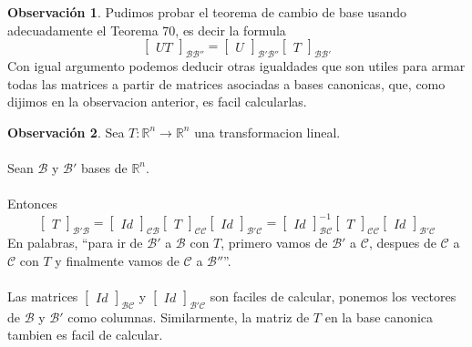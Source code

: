 \documentclass{article}
\theoremstyle{definition}
\theoremstyle{definition}
\newtheorem*{obs}{Observación}
\theoremstyle{remark}
\begin{document}
\begin{obs}
  Pudimos probar el teorema de cambio de base usando adecuadamente el Teorema 70, es decir la formula \[
    \begin{bmatrix}UT\end{bmatrix}_{\mathcal{B}\mathcal{B''}} = \begin{bmatrix}U\end{bmatrix}_{\mathcal{B'}\mathcal{B''}}\begin{bmatrix}T\end{bmatrix}_{\mathcal{B}\mathcal{B'}}
  \]
  Con igual argumento podemos deducir otras igualdades que son utiles para armar todas las matrices a partir de matrices asociadas a bases canonicas, que, como dijimos en la observacion anterior, es facil calcularlas.
\end{obs}
\begin{obs}
  Sea $T : \mathbb{R}^n \to \mathbb{R}^n$ una transformacion lineal. \\\\ Sean $\mathcal{B}$ y $\mathcal{B'}$ bases de $\mathbb{R}^n$. \\\\ Entonces \[
    \begin{bmatrix}T\end{bmatrix}_{\mathcal{B'}\mathcal{B}}=\begin{bmatrix}Id\end{bmatrix}_{\mathcal{C}\mathcal{B}}\begin{bmatrix}T\end{bmatrix}_{\mathcal{C}\mathcal{C}}\begin{bmatrix}Id\end{bmatrix}_{\mathcal{B'}\mathcal{C}}=\begin{bmatrix}Id\end{bmatrix}^{-1}_{\mathcal{B}\mathcal{C}}\begin{bmatrix}T\end{bmatrix}_{\mathcal{C}\mathcal{C}}\begin{bmatrix}Id\end{bmatrix}_{\mathcal{B'}\mathcal{C}}
  \]
  En palabras, ``para ir de $\mathcal{B'}$ a $\mathcal{B}$ con $T$, primero vamos de $\mathcal{B'}$ a $\mathcal{C}$, despues de $\mathcal{C}$ a $\mathcal{C}$ con $T$ y finalmente vamos de $\mathcal{C}$ a $\mathcal{B''}$''.\\\\ Las matrices $\begin{bmatrix}Id\end{bmatrix}_{\mathcal{B}\mathcal{C}}$ y $\begin{bmatrix}Id\end{bmatrix}_{\mathcal{B'}\mathcal{C}}$ son faciles de calcular, ponemos los vectores de $\mathcal{B}$ y $\mathcal{B'}$ como columnas. Similarmente, la matriz de $T$ en la base canonica tambien es facil de calcular.
\end{obs}
\end{document}
